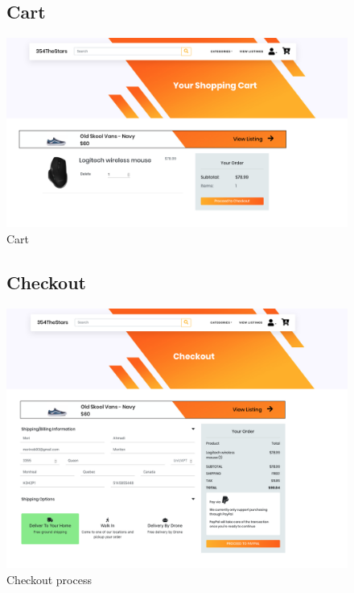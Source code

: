 \documentclass[11pt]{article}
\begin{document}
\begin{figure}[ht!]
    \subsection{Cart}
    \centering
    \includegraphics[width=\textwidth,height=0.3\paperheight,keepaspectratio]{Diagrams/External_Interfaces/Cart.png}
    \caption{Cart}
    \label{fig: Latest listings}
\end{figure}
\FloatBarrier

\begin{figure}[ht!]
    \subsection{Checkout}
    \centering
    \includegraphics[width=\textwidth,height=0.3\paperheight,keepaspectratio]{Diagrams/External_Interfaces/Checkout.png}
    \caption{Checkout process}
    \label{fig: Latest listings}
\end{figure}
\clearpage
\end{document}

